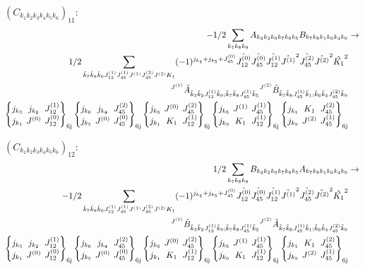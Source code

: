 \documentclass[11pt]{article}
\newcommand{\sixj}[6]{\begingroup\setlength{\arraycolsep}{0.2em}\begin{Bmatrix} #1 & #2 & #3 \\ #4 & #5 & #6 \end{Bmatrix}_{\text{6j}}\endgroup}
\begin{document}
$\left({C}_{{k}_{1}{k}_{2}{k}_{3}{k}_{4}{k}_{5}{k}_{6}}\right)_{11}$:
\begin{align}
-1/2\sum_{{k}_{7}{k}_{8}{k}_{9}}{A}_{{k}_{3}{k}_{2}{k}_{9}{k}_{7}{k}_{8}{k}_{5}}{B}_{{k}_{7}{k}_{8}{k}_{1}{k}_{6}{k}_{4}{k}_{9}}&\rightarrow \notag \\1/2\sum_{\tilde{k}_{7}\tilde{k}_{8}\tilde{k}_{9}J^{(1)}_{12}J^{(1)}_{45}J^{(1)}J^{(2)}_{45}J^{(2)}K_{1}}(-1)^{j_{{k}_{4}} +j_{{k}_{5}} +J^{(0)}_{45} }\hat{J^{(0)}_{12}}\hat{J^{(0)}_{45}}\hat{J^{(1)}_{12}}\hat{J^{(1)}}^{2}\hat{J^{(2)}_{45}}\hat{J^{(2)}}^{2}\hat{K_{1}}^{2}& \notag \\{}^{J^{(1)}}\tilde{A}_{\tilde{k}_{3}\tilde{k}_{2}J^{(1)}_{12}\tilde{k}_{9};\tilde{k}_{7}\tilde{k}_{8}J^{(1)}_{45}\tilde{k}_{5}}{}^{J^{(2)}}\tilde{B}_{\tilde{k}_{7}\tilde{k}_{8}J^{(1)}_{45}\tilde{k}_{1};\tilde{k}_{6}\tilde{k}_{4}J^{(2)}_{45}\tilde{k}_{9}}& \notag \\\sixj{j_{{k}_{3}}}{j_{{k}_{2}}}{J^{(1)}_{12}}{j_{{k}_{1}}}{J^{(0)}}{J^{(0)}_{12}}\sixj{j_{{k}_{6}}}{j_{{k}_{4}}}{J^{(2)}_{45}}{j_{{k}_{5}}}{J^{(0)}}{J^{(0)}_{45}}\sixj{j_{{k}_{5}}}{J^{(0)}}{J^{(2)}_{45}}{j_{{k}_{1}}}{K_{1}}{J^{(1)}_{12}}\sixj{j_{{k}_{5}}}{J^{(1)}}{J^{(1)}_{45}}{j_{{k}_{9}}}{K_{1}}{J^{(1)}_{12}}\sixj{j_{{k}_{1}}}{K_{1}}{J^{(2)}_{45}}{j_{{k}_{9}}}{J^{(2)}}{J^{(1)}_{45}}
\end{align}

$\left({C}_{{k}_{1}{k}_{2}{k}_{3}{k}_{4}{k}_{5}{k}_{6}}\right)_{12}$:
\begin{align}
1/2\sum_{{k}_{7}{k}_{8}{k}_{9}}{B}_{{k}_{3}{k}_{2}{k}_{9}{k}_{7}{k}_{8}{k}_{5}}{A}_{{k}_{7}{k}_{8}{k}_{1}{k}_{6}{k}_{4}{k}_{9}}&\rightarrow \notag \\-1/2\sum_{\tilde{k}_{7}\tilde{k}_{8}\tilde{k}_{9}J^{(1)}_{12}J^{(1)}_{45}J^{(1)}J^{(2)}_{45}J^{(2)}K_{1}}(-1)^{j_{{k}_{4}} +j_{{k}_{5}} +J^{(0)}_{45} }\hat{J^{(0)}_{12}}\hat{J^{(0)}_{45}}\hat{J^{(1)}_{12}}\hat{J^{(1)}}^{2}\hat{J^{(2)}_{45}}\hat{J^{(2)}}^{2}\hat{K_{1}}^{2}& \notag \\{}^{J^{(1)}}\tilde{B}_{\tilde{k}_{3}\tilde{k}_{2}J^{(1)}_{12}\tilde{k}_{9};\tilde{k}_{7}\tilde{k}_{8}J^{(1)}_{45}\tilde{k}_{5}}{}^{J^{(2)}}\tilde{A}_{\tilde{k}_{7}\tilde{k}_{8}J^{(1)}_{45}\tilde{k}_{1};\tilde{k}_{6}\tilde{k}_{4}J^{(2)}_{45}\tilde{k}_{9}}& \notag \\\sixj{j_{{k}_{3}}}{j_{{k}_{2}}}{J^{(1)}_{12}}{j_{{k}_{1}}}{J^{(0)}}{J^{(0)}_{12}}\sixj{j_{{k}_{6}}}{j_{{k}_{4}}}{J^{(2)}_{45}}{j_{{k}_{5}}}{J^{(0)}}{J^{(0)}_{45}}\sixj{j_{{k}_{5}}}{J^{(0)}}{J^{(2)}_{45}}{j_{{k}_{1}}}{K_{1}}{J^{(1)}_{12}}\sixj{j_{{k}_{5}}}{J^{(1)}}{J^{(1)}_{45}}{j_{{k}_{9}}}{K_{1}}{J^{(1)}_{12}}\sixj{j_{{k}_{1}}}{K_{1}}{J^{(2)}_{45}}{j_{{k}_{9}}}{J^{(2)}}{J^{(1)}_{45}}
\end{align}
\end{document}
